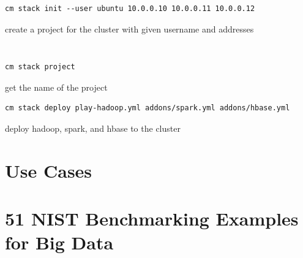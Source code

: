 \begin{Verbatim}[fontfamily=helvetica]
cm stack init --user ubuntu 10.0.0.10 10.0.0.11 10.0.0.12
\end{Verbatim}

create a project for the cluster with given username and addresses


\begin{Verbatim}[fontfamily=helvetica]

\end{Verbatim}

\begin{Verbatim}[fontfamily=helvetica]

\end{Verbatim}

\begin{Verbatim}[fontfamily=helvetica]
cm stack project
\end{Verbatim}

get the name of the project

\begin{Verbatim}[fontfamily=helvetica]
cm stack deploy play-hadoop.yml addons/spark.yml addons/hbase.yml
\end{Verbatim}

deploy hadoop, spark, and hbase to the cluster

\section{Use Cases}


\section{51 NIST Benchmarking Examples for Big Data}

